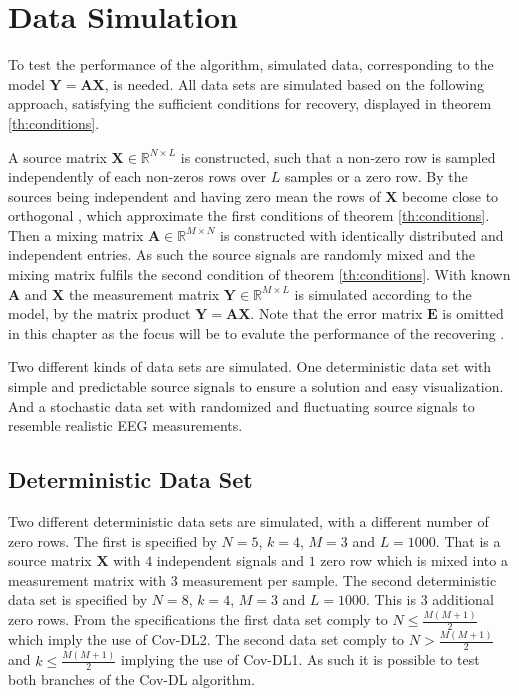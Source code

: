 \section{Data Simulation}\label{sec:dataset}
To test the performance of the algorithm, simulated data, corresponding to the model $\mathbf{Y} = \mathbf{A}\mathbf{X}$, is needed. All data sets are simulated based on the following approach, satisfying the sufficient conditions for recovery, displayed in theorem \ref{th:conditions}.
 
A source matrix $\mathbf{X} \in \mathbb{R}^{N \times L}$ is constructed, such that a non-zero row is sampled independently of each non-zeros rows over $L$ samples or a zero row. 
By the sources being independent and having zero mean the rows of $\mathbf{X}$ become close to orthogonal \cite{Balkan2014},
which approximate the first conditions of theorem \ref{th:conditions}.   
Then a mixing matrix $\mathbf{A} \in \mathbb{R}^{M \times N}$ is constructed with identically distributed and independent entries. 
As such the source signals are randomly mixed and the mixing matrix fulfils the second condition of theorem \ref{th:conditions}.
With known $\mathbf{A}$ and $\mathbf{X}$ the measurement matrix $\mathbf{Y} \in \mathbb{R}^{M \times L}$ is simulated according to the model, by the matrix product $\mathbf{Y} = \mathbf{AX}$. Note that the error matrix $\mathbf{E}$ is omitted in this chapter as the focus will be to evalute the performance of the recovering .  

Two different kinds of data sets are simulated.
One deterministic data set with simple and predictable source signals to ensure a solution and easy visualization.
And a stochastic data set with randomized and fluctuating source signals to resemble realistic EEG measurements.

\subsection{Deterministic Data Set}\label{subseg_simpledata}
Two different deterministic data sets are simulated, with a different number of zero rows. 
The first is specified by $N = 5$, $k = 4$, $M = 3$ and $L = 1000$. That is a source matrix $\mathbf{X}$ with $4$ independent  signals and $1$ zero row which is mixed into a measurement matrix with $3$ measurement per sample.  
The second deterministic data set is specified by $N = 8$, $k = 4$, $M = 3$ and $L = 1000$. This is 3 additional zero rows.
From the specifications the first data set comply to $N \leq \frac{M(M+1)}{2}$ which imply the use of Cov-DL2.
The second data set comply to $N > \frac{M(M+1)}{2}$ and $k \leq \frac{M(M+1)}{2}$ implying the use of Cov-DL1. 
As such it is possible to test both branches of the Cov-DL algorithm. 
     
